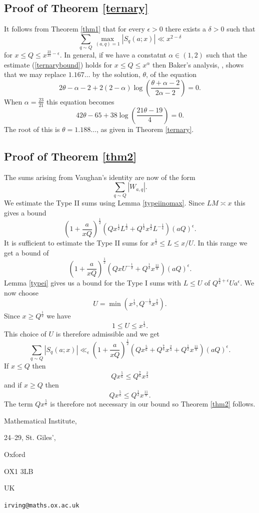 \documentclass[12pt]{article}
\begin{document}
\subsection{Proof of Theorem \ref{ternary}}

It follows from Theorem \ref{thm1} that for every $\epsilon>0$ there exists a $\delta>0$ such that 
\begin{equation}\label{ternarybound}
\sum_{q\sim Q}\max_{(a,q)=1}|S_q(a;x)|\ll x^{2-\delta}
\end{equation}
for $x\leq Q\leq x^{\frac{23}{21}-\epsilon}$.  In general, if we have a constatnt $\alpha\in (1,2)$ such that the estimate (\ref{ternarybound}) holds for $x\leq Q\leq x^\alpha$ then Baker's analysis, \cite{baker}, shows that we may  replace $1.167\ldots$ by the solution, $\theta$, of the equation 
$$2\theta-\alpha-2+2(2-\alpha)\log\left(\frac{\theta+\alpha-2}{2\alpha-2}\right)=0.$$
When $\alpha=\frac{23}{21}$ this equation becomes 
$$42\theta-65+38\log\left(\frac{21\theta-19}{4}\right)=0.$$
The root of this is $\theta=1.188\ldots$, as given in Theorem \ref{ternary}.

\subsection{Proof of Theorem \ref{thm2}}

The sums arising from Vaughan's identity are now of the form 
$$\sum_{q\sim Q}|W_{a,q}|.$$
We estimate the Type II sums using Lemma \ref{typeiinomax}.  Since $LM\asymp x$ this gives a bound 
$$(1+\frac{a}{xQ})^{\frac12}(Qx^{\frac12}L^{\frac12}+Q^{\frac12}x^{\frac32}L^{-\frac14})(aQ)^\epsilon.$$
It is sufficient to estimate the Type II sums for $x^{\frac12}\leq L\leq x/U$.  In this range we get a bound of 
$$(1+\frac{a}{xQ})^{\frac12}(QxU^{-\frac12}+Q^{\frac12}x^{\frac{11}{8}})(aQ)^\epsilon.$$
Lemma \ref{typei} gives us a bound for the Type I sums with $L\leq U$ of $Q^{\frac32+\epsilon}Ua^\epsilon$.  We now choose 
$$U=\min(x^{\frac13},Q^{-\frac13}x^{\frac23}).$$
Since $x\geq Q^{\frac12}$ we have 
$$1\leq U\leq x^{\frac13}.$$
This choice of $U$ is therefore admissible and we get 
$$\sum_{q\sim Q}|S_q(a;x)|\ll_\epsilon (1+\frac{a}{xQ})^{\frac12}(Qx^{\frac56}+Q^{\frac76}x^{\frac23}+Q^{\frac12}x^{\frac{11}{8}})(aQ)^\epsilon.$$
If $x\leq  Q$ then 
$$Qx^{\frac56}\leq Q^{\frac76}x^{\frac23}$$
and if $x\geq Q$ then 
$$Qx^{\frac56}\leq Q^{\frac12}x^{\frac{11}{8}}.$$
The term $Qx^{\frac56}$ is therefore not necessary in our bound so Theorem \ref{thm2} follows.

\newpage

 

\bigskip
\bigskip

Mathematical Institute,

24--29, St. Giles',

Oxford

OX1 3LB

UK
\bigskip

{\tt irving@maths.ox.ac.uk}
\end{document}
